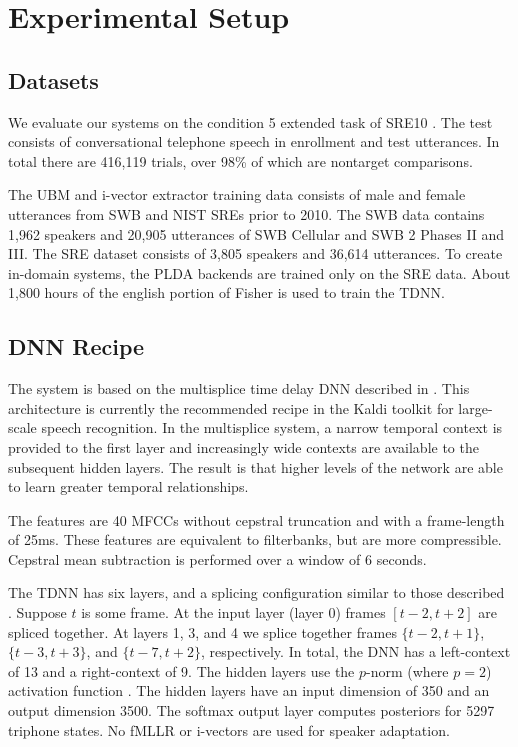 \documentclass{article}
\begin{document}
\section{Experimental Setup}

\subsection{Datasets}
\label{datasets}
We evaluate our systems on the condition 5 extended task of 
SRE10 \cite{sre10}. The test consists of conversational telephone speech
in enrollment and test utterances. In total there are 416,119 trials,
over 98\% of which are nontarget comparisons. 

The UBM and i-vector extractor training data consists of male and female
utterances from SWB and NIST SREs prior to 2010. The SWB data contains
1,962 speakers and 20,905 utterances of SWB Cellular and SWB 2 
Phases II and III. The SRE dataset consists of 3,805 speakers 
and 36,614 utterances.
To create in-domain systems, the PLDA backends 
are trained only on the SRE data. About 1,800 hours
of the english portion of Fisher \cite{fisher} is
used to train the TDNN.

\subsection{DNN Recipe}
\label{dnn_recipe}

The system is based on the multisplice 
time delay DNN described
in \cite{multisplice}. This architecture is currently the recommended
recipe in the Kaldi toolkit \cite{kaldi} for large-scale speech recognition. 
In the multisplice system, a narrow temporal
context is provided to the first layer and increasingly wide
contexts are available to the subsequent hidden layers. The result is that
higher levels of the network are able to learn greater temporal
relationships. 

The features are 40 MFCCs without cepstral
truncation and with a frame-length of 25ms. 
These features are equivalent to filterbanks, but
are more compressible. Cepstral mean subtraction is 
performed over a window of
6 seconds. 

The TDNN has six layers, and a splicing configuration similar to those described
\cite{multisplice}. 
Suppose $t$ is some frame. At the input layer (layer 0)
frames $[t - 2, t + 2]$ are spliced together.
At layers 1, 3, and 4 we splice together frames 
$\{t-2, t+1\}$, $\{t - 3, t + 3\}$, and $\{t - 7, t + 2\}$, 
respectively.
In total, the DNN has a left-context of 13 and a right-context of 9.
The hidden layers use the $p$-norm (where $p=2$)
activation function \cite{pnorm}. The hidden layers have an 
input dimension of 350 and an output dimension 3500. 
The softmax output layer computes posteriors for 5297 triphone states. No
fMLLR or i-vectors are used for speaker adaptation.
\end{document}
